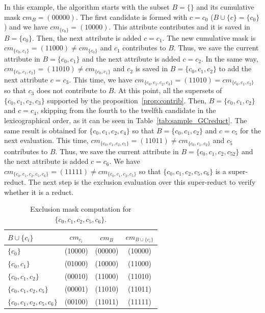 \documentclass[number,preprint,review,12pt]{elsarticle}
\begin{document}
	\label{par:step}
	In this example, the algorithm starts with the subset $B=\lbrace \rbrace$ and its cumulative mask $cm_B=(00000)$. The first candidate is formed with $c=c_0$ ($B\cup \lbrace c\rbrace = \lbrace c_0\rbrace$) and we have $cm_{\lbrace c_0\rbrace}=(10000)$. This attribute contributes and it is saved in $B=\lbrace c_0\rbrace$. Then, the next attribute is added $c = c_1$. The new cumulative mask is $cm_{\lbrace c_0,c_1\rbrace}=(11000)\neq cm_{\lbrace c_0\rbrace}$ and $c_1$ contributes to $B$. Thus, we save the current attribute in $B = \lbrace c_0,c_1\rbrace$ and the next attribute is added $c = c_2$. In the same way, $cm_{\lbrace c_0,c_1,c_2\rbrace}=(11010)\neq cm_{\lbrace c_0,c_1\rbrace}$ and $c_2$ is saved in $B = \lbrace c_0,c_1,c_2\rbrace$ to add the next attribute $c = c_3$. This time, we have $cm_{\lbrace c_0,c_1,c_2,c_3\rbrace}=(11010) = cm_{\lbrace c_0,c_1,c_2\rbrace}$ so that $c_3$ does not contribute to $B$. At this point, all the supersets of $\lbrace c_0,c_1,c_2,c_3\rbrace$ supported by the proposition~\ref{prop:contrib}. Then, $B = \lbrace c_0,c_1,c_2\rbrace$ and $c = c_4$, skipping from the fourth to the twelfth candidate in the lexicographical order, as it can be seen in  Table~\ref{tab:sample_GCreduct}. The same result is obtained for $\lbrace c_0,c_1,c_2,c_4\rbrace$ so that $B = \lbrace c_0,c_1,c_2\rbrace$ and $c = c_5$ for the next evaluation. This time, $cm_{\lbrace c_0,c_1,c_2,c_5\rbrace}=(11011)\neq cm_{\lbrace c_0,c_1,c_2\rbrace}$ and $c_5$ contributes to $B$. Thus, we save the current attribute in $B = \lbrace c_0,c_1,c_2,c_52\rbrace$ and the next attribute is added $c = c_6$. We have $cm_{\lbrace c_0,c_1,c_2,c_5,c_6\rbrace}=(11111)\neq cm_{\lbrace c_0,c_1,c_2,c_5\rbrace}$ so that $\lbrace c_0,c_1,c_2,c_5,c_6\rbrace$ is a super-reduct. The next step is the exclusion evaluation over this super-reduct to verify whether it is a reduct.
	
	\begin{table}[!htb]
		\caption{Exclusion mask computation for $\lbrace c_0,c_1,c_2,c_5,c_6\rbrace$.}\label{tab:em}
		\centering 
		\begin{tabular}{|l|c|c|c|}
			\hline
			$B\cup \lbrace c_i\rbrace$                          & $cm_{c_i}$ & $cm_B$  & $em_{B\cup \lbrace c_i\rbrace}$ \\
			\hline
			$\lbrace c_0\rbrace$                 & (10000)    & (00000) & (10000)          \\
			$\lbrace c_0,c_1\rbrace$             & (01000)    & (10000) & (11000)          \\
			$\lbrace c_0,c_1,c_2\rbrace$         & (00010)    & (11000) & (11010)          \\
			$\lbrace c_0,c_1,c_2,c_5\rbrace$     & (00001)    & (11010) & (11011)          \\
			$\lbrace c_0,c_1,c_2,c_5,c_6\rbrace$ & (00100)    & (11011) & (11111)          \\
			\hline
		\end{tabular}
	\end{table}
	
\end{document}
